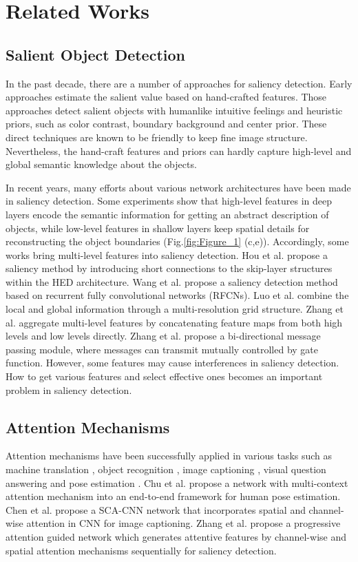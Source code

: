 \documentclass[10pt,twocolumn,letterpaper]{article}
\begin{document}
\section{Related Works}

\subsection{Salient Object Detection}
In the past decade, there are a number of approaches for saliency detection. Early approaches\cite{craft1,craft2,craft3,craft4} estimate the salient value based on hand-crafted features. Those approaches detect salient objects with humanlike intuitive feelings and heuristic priors, such as color contrast\cite{craft1}, boundary background\cite{craft2,craft3} and center prior\cite{craft4}. These direct techniques are known to be friendly to keep fine image structure. Nevertheless, the hand-craft features and priors can hardly capture high-level and global semantic knowledge about the objects.

In recent years, many efforts about various network architectures have been made in saliency detection.  Some experiments\cite{dss,eld,dsrn} show that high-level features in deep layers encode the semantic information for getting an abstract description of objects, while low-level features in shallow layers keep spatial details for reconstructing the object boundaries (Fig.\ref{fig:Figure_1} (c,e)). Accordingly, some works bring multi-level features into saliency detection. Hou et al. \cite{dss} propose a saliency method by introducing short connections to the skip-layer structures within the HED architecture. Wang et al. \cite{rfcn} propose a saliency detection method based on recurrent fully convolutional networks (RFCNs). Luo et al. \cite{nldf} combine the local and global information through a multi-resolution grid structure. Zhang et al. \cite{amulet} aggregate multi-level features by concatenating feature maps from both high levels and low levels directly. Zhang et al. \cite{bdmpm} propose a bi-directional message passing module, where messages can transmit mutually controlled by gate function. However, some features may cause interferences in saliency detection. How to get various features and select effective ones becomes an important problem in saliency detection.

\subsection{Attention Mechanisms}
Attention mechanisms have been successfully applied in various tasks such as machine translation \cite{translation}, object recognition \cite{detection1}, image captioning \cite{scacaption,caption2}, visual question answering \cite{qa1, qa2} and pose estimation \cite{pose}. Chu et al. \cite{pose} propose a network with multi-context attention mechanism into an end-to-end framework for human pose estimation. Chen et al. \cite{scacaption} propose a SCA-CNN network that incorporates spatial and channel-wise attention in CNN for image captioning. Zhang et al.\cite{pagrn} propose a progressive attention guided network which generates attentive features by channel-wise and spatial attention mechanisms sequentially for saliency detection.
\end{document}
